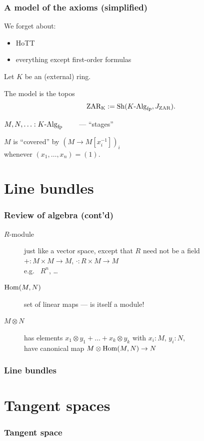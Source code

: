 \documentclass[aspectratio=1610]{beamer}
\begin{document}
\begin{frame}
  \frametitle{A model of the axioms (simplified)}

  We forget about:
  \begin{itemize}
    \item
      HoTT
    \item
      everything except first-order formulas
  \end{itemize}

  \pause%
  \bigskip
  Let $K$ be an (external) ring.

  \bigskip
  The model is the topos
  \[\mathrm{ZAR_K} := \Sh(\Alg{K}_{\mathrm{fp}}, J_{\mathrm{ZAR}}) \rlap{.}\]

  \bigskip
  $M, N, \ldots : K\text{-}\mathrm{Alg}_{\mathrm{fp}}$ $\qquad$--- \enquote{stages}

  \bigskip
  $M$ is \enquote{covered} by $(M \to M[x_i^{-1}])_i$\\
  whenever $(x_1, \dots, x_n) = (1)$.
\end{frame}

\appendix

\section{Line bundles}

\begin{frame}
  \frametitle{Review of algebra (cont'd)}

  \begin{description}
    \item[$R$-module]
      just like a vector space, except that $R$ need not be a field\\
      ${+} : M \times M \to M$, ${\cdot} : R \times M \to M$\\
      {
      e.g.\ %
      $R^n$,
      \dots}
      \pause%
    \bigskip
    \item[$\mathrm{Hom}(M, N)$]
      set of linear maps
      --- is itself a module!
      \pause%
    \bigskip
    \item[$M \otimes N$]
      has elements $x_1 \otimes y_1 + \dots + x_k \otimes y_k$ with $x_i : M$, $y_i : N$,\\
      have canonical map $M \otimes \mathrm{Hom}(M, N) \to N$
  \end{description}
\end{frame}

\begin{frame}
  \frametitle{Line bundles}
\end{frame}

\section{Tangent spaces}

\begin{frame}
  \frametitle{Tangent space}
\end{frame}
\end{document}
